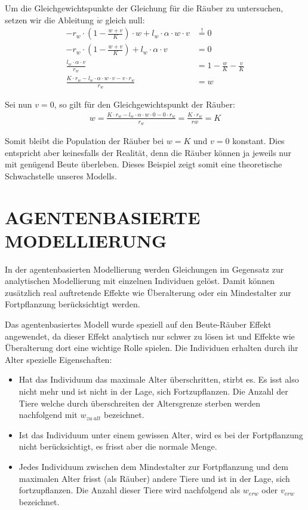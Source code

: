 \documentclass[a4paper,twoside]{article}
\begin{document}
	Um die Gleichgewichtspunkte der Gleichung für die Räuber zu untersuchen, setzen wir die Ableitung \(\dot{w}\) gleich null:
	\begin{align*}
		-r_w \cdot \left(1 - \frac{w+v}{K} \right) \cdot w + l_w \cdot \alpha \cdot w \cdot v &\stackrel{!}{=} 0\\
		-r_w \cdot \left(1 - \frac{w+v}{K} \right) + l_w \cdot \alpha \cdot v &= 0\\
		\frac{l_w \cdot \alpha \cdot v}{r_w} &= 1 - \frac{w}{K}-\frac{v}{K}\\
		\frac{K \cdot r_w - l_w \cdot \alpha \cdot w \cdot v - v \cdot r_w}{r_w} &= w
	\end{align*}
	
	Sei nun \(v=0\), so gilt für den Gleichgewichtspunkt der Räuber:
	\begin{align*}
		w = \frac{K \cdot r_w - l_w \cdot \alpha \cdot w \cdot 0 - 0 \cdot r_w}{r_w} = \frac{K \cdot r_w}{rw} = K
	\end{align*}	
	
	Somit bleibt die Population der Räuber bei \(w=K\) und \(v=0\) konstant. Dies entspricht aber keinesfalls der Realität, denn die Räuber können ja jeweils nur mit genügend Beute überleben. Dieses Beispiel zeigt somit eine theoretische Schwachstelle unseres Modells.
	
	\newpage
	
	\section{\uppercase{Agentenbasierte Modellierung}}
	
	In der agentenbasierten Modellierung werden Gleichungen im Gegensatz zur analytischen Modellierung mit einzelnen Individuen gelöst. Damit können zusätzlich real auftretende Effekte wie Überalterung oder ein Mindestalter zur Fortpflanzung berücksichtigt werden.
	
	Das agentenbasiertes Modell wurde speziell auf den Beute-Räuber Effekt angewendet, da dieser Effekt analytisch nur schwer zu lösen ist und Effekte wie Überalterung dort eine wichtige Rolle spielen. Die Individuen erhalten durch ihr Alter spezielle Eigenschaften:
	\begin{itemize}
		\item Hat das Individuum das maximale Alter überschritten, stirbt es. Es isst also nicht mehr und ist nicht in der Lage, sich Fortzupflanzen. Die Anzahl der Tiere welche durch überschreiten der Altersgrenze sterben werden nachfolgend mit \(w_{zu~alt}\) bezeichnet.
		\item Ist das Individuum unter einem gewissen Alter, wird es bei der Fortpflanzung nicht berücksichtigt, es frisst aber die normale Menge.
		\item Jedes Individuum zwischen dem Mindestalter zur Fortpflanzung und dem maximalen Alter frisst (als Räuber) andere Tiere und ist in der Lage, sich fortzupflanzen. Die Anzahl dieser Tiere wird nachfolgend als \(w_{erw}\) oder \(v_{erw}\) bezeichnet.
	\end{itemize}
	
\end{document}
